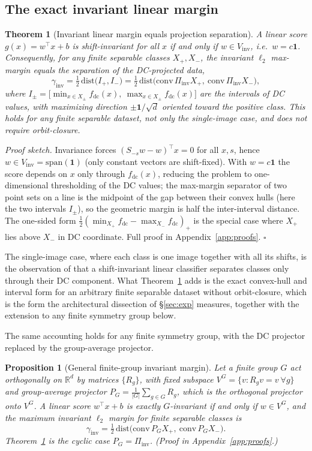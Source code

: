 \documentclass{article}
\newtheorem{theorem}{Theorem}
\newtheorem{proposition}{Proposition}
\theoremstyle{definition}
\newcommand{\R}{\mathbb{R}}
\newcommand{\fdc}{f_{\mathrm{dc}}}
\newcommand{\Vinv}{V_{\mathrm{inv}}}
\newcommand{\dd}{d}
\begin{document}
\subsection{The exact invariant linear margin}
\begin{theorem}[Invariant linear margin equals projection separation]\label{thm:A}
A linear score $g(x)=w^\top x+b$ is shift-invariant for all $x$ if and only if $w\in\Vinv$, i.e.\ $w=c\mathbf 1$. Consequently, for any finite separable classes $X_+,X_-$, the invariant $\ell_2$ max-margin equals the separation of the DC-projected data,
\[
\gamma_{\mathrm{inv}}=\tfrac12\,\mathrm{dist}\big(I_+,I_-\big)
=\tfrac12\,\mathrm{dist}\big(\mathrm{conv}\,\Pi_{\mathrm{inv}}X_+,\ \mathrm{conv}\,\Pi_{\mathrm{inv}}X_-\big),
\]
where $I_\pm=\big[\min_{x\in X_\pm}\fdc(x),\ \max_{x\in X_\pm}\fdc(x)\big]$ are the intervals of DC values, with maximizing direction $\pm\mathbf 1/\sqrt\dd$ oriented toward the positive class. This holds for any finite separable dataset, not only the single-image case, and does not require orbit-closure.
\end{theorem}
\emph{Proof sketch.} Invariance forces $(S_{-s}w-w)^\top x=0$ for all $x,s$, hence $w\in\Vinv=\mathrm{span}(\mathbf 1)$ (only constant vectors are shift-fixed). With $w=c\mathbf 1$ the score depends on $x$ only through $\fdc(x)$, reducing the problem to one-dimensional thresholding of the DC values; the max-margin separator of two point sets on a line is the midpoint of the gap between their convex hulls (here the two intervals $I_\pm$), so the geometric margin is half the inter-interval distance. The one-sided form $\tfrac12(\min_{X_+}\fdc-\max_{X_-}\fdc)_+$ is the special case where $X_+$ lies above $X_-$ in DC coordinate. Full proof in Appendix~\ref{app:proofs}. \hfill$\square$

The single-image case, where each class is one image together with all its shifts, is the observation of \citet{ge2021shift} that a shift-invariant linear classifier separates classes only through their DC component. What Theorem~\ref{thm:A} adds is the exact convex-hull and interval form for an arbitrary finite separable dataset without orbit-closure, which is the form the architectural dissection of \S\ref{sec:exp} measures, together with the extension to any finite symmetry group below.

The same accounting holds for any finite symmetry group, with the DC projector replaced by the group-average projector.
\begin{proposition}[General finite-group invariant margin]\label{thm:finite-group}
Let a finite group $G$ act orthogonally on $\R^\dd$ by matrices $\{R_g\}$, with fixed subspace $V^G=\{v:R_gv=v\ \forall g\}$ and group-average projector $P_G=\tfrac1{|G|}\sum_{g\in G}R_g$, which is the orthogonal projector onto $V^G$. A linear score $w^\top x+b$ is exactly $G$-invariant if and only if $w\in V^G$, and the maximum invariant $\ell_2$ margin for finite separable classes is
\[
\gamma_{\mathrm{inv}}=\tfrac12\,\mathrm{dist}\big(\mathrm{conv}\,P_GX_+,\ \mathrm{conv}\,P_GX_-\big).
\]
Theorem~\ref{thm:A} is the cyclic case $P_G=\Pi_{\mathrm{inv}}$. (Proof in Appendix~\ref{app:proofs}.)
\end{proposition}
\end{document}
